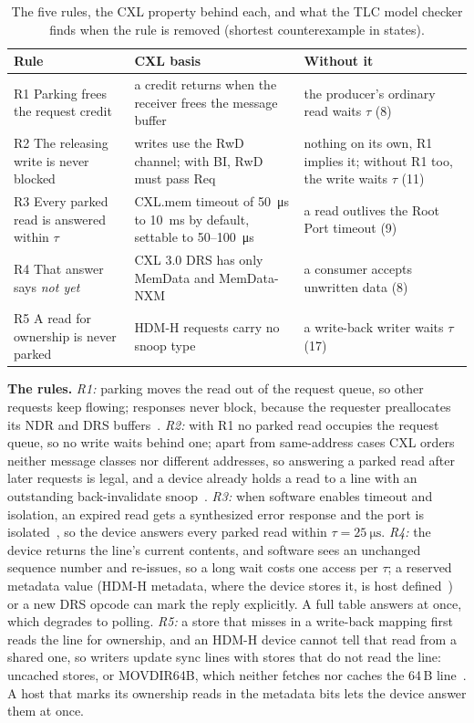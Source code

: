 \documentclass[journal]{IEEEtran}
\begin{document}
\begin{table}[t]
\centering
\caption{The five rules, the CXL property behind each, and what the TLC model checker finds when
the rule is removed (shortest counterexample in states).}
\label{tab:rules}
\scriptsize\setlength{\tabcolsep}{3pt}
\begin{tabular}{@{}>{\raggedright}p{2.35cm}>{\raggedright}p{2.75cm}>{\raggedright\arraybackslash}p{3.2cm}@{}}
\toprule
Rule & CXL basis & Without it \\
\midrule
R1 Parking frees the request credit & a credit returns when the receiver frees the message
buffer~\cite{cxl3} & the producer's ordinary read waits $\tau$ (8) \\
R2 The releasing write is never blocked & writes use the RwD channel; with BI, RwD must pass
Req~\cite{cxl3} & nothing on its own, R1 implies it; without R1 too, the write waits $\tau$ (11) \\
R3 Every parked read is answered within $\tau$ & CXL.mem timeout of \SI{50}{\micro\second} to
\SI{10}{\milli\second} by default, settable to 50--\SI{100}{\micro\second}~\cite{cxl32} & a read outlives the Root Port timeout (9) \\
R4 That answer says \emph{not yet} & CXL 3.0 DRS has only MemData and MemData-NXM~\cite{cxl3} &
a consumer accepts unwritten data (8) \\
R5 A read for ownership is never parked & HDM-H requests carry no snoop type~\cite{cxl32} & a
write-back writer waits $\tau$ (17) \\
\bottomrule
\end{tabular}
\end{table}

\textbf{The rules.} \emph{R1:} parking moves the read out of the request queue, so other requests
keep flowing; responses never block, because the requester preallocates its NDR and DRS
buffers~\cite{cxl3}. \emph{R2:} with R1 no parked read occupies the request queue, so no write
waits behind one; apart from same-address cases CXL orders neither message classes nor
different addresses, so answering a parked read after later requests is legal, and a device already holds a
read to a line with an outstanding back-invalidate snoop~\cite{cxl3}. \emph{R3:} when software
enables timeout and isolation, an expired read gets a synthesized error response and the port is
isolated~\cite{cxl32}, so the device answers every parked read within $\tau=\SI{25}{\micro\second}$.
\emph{R4:} the device returns the line's current contents, and software sees an unchanged sequence
number and re-issues, so a long wait costs one access per $\tau$; a reserved metadata value (HDM-H
metadata, where the device stores it, is host defined~\cite{cxl32}) or a new DRS opcode can mark the
reply explicitly. A full table answers at once, which degrades to polling. \emph{R5:} a store that
misses in a write-back mapping first reads the line for ownership, and an HDM-H device cannot tell
that read from a shared one, so writers update sync lines with stores that do not read the line:
uncached stores, or MOVDIR64B, which neither fetches nor caches the 64\,B line~\cite{intelsdm}. A
host that marks its ownership reads in the metadata bits lets the device answer them at once.
\end{document}
